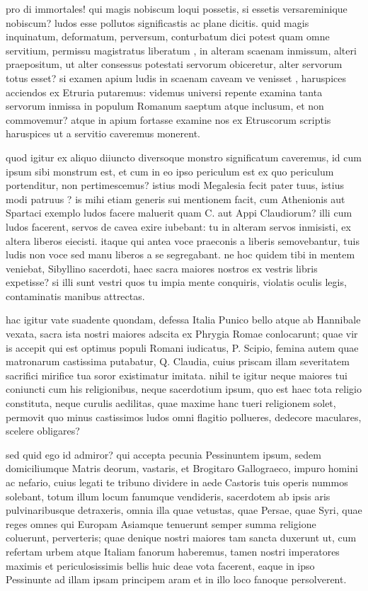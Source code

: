  pro di immortales! qui magis nobiscum loqui possetis, si essetis versareminique nobiscum? ludos esse pollutos significastis ac plane dicitis. quid magis inquinatum, deformatum, perversum, conturbatum dici potest quam omne servitium, permissu magistratus liberatum , in alteram scaenam inmissum, alteri praepositum, ut alter consessus potestati servorum obiceretur, alter servorum totus esset? si examen apium ludis in scaenam caveam ve venisset , haruspices acciendos ex Etruria putaremus: videmus universi repente examina tanta servorum inmissa in populum Romanum saeptum atque inclusum, et non commovemur? atque in apium fortasse examine nos ex Etruscorum scriptis haruspices ut a servitio caveremus monerent.

 quod igitur ex aliquo diiuncto diversoque monstro significatum caveremus, id cum ipsum sibi monstrum est, et cum in eo ipso periculum est ex quo periculum portenditur, non pertimescemus? istius modi Megalesia fecit pater tuus, istius modi patruus ? is mihi etiam generis sui mentionem facit, cum Athenionis aut Spartaci exemplo ludos facere maluerit quam C. aut Appi Claudiorum? illi cum ludos facerent, servos de cavea exire iubebant: tu in alteram servos inmisisti, ex altera liberos eiecisti. itaque qui antea voce praeconis a liberis semovebantur, tuis ludis non voce sed manu liberos a se segregabant. ne hoc quidem tibi in mentem veniebat, Sibyllino sacerdoti, haec sacra maiores nostros ex vestris libris expetisse? si illi sunt vestri quos tu impia mente conquiris, violatis oculis legis, contaminatis manibus attrectas.

 hac igitur vate suadente quondam, defessa Italia Punico bello atque ab Hannibale vexata, sacra ista nostri maiores adscita ex Phrygia Romae conlocarunt; quae vir is accepit qui est optimus populi Romani iudicatus, P. Scipio, femina autem quae matronarum castissima putabatur, Q. Claudia, cuius priscam illam severitatem sacrifici mirifice tua soror existimatur imitata. nihil te igitur neque maiores tui coniuncti cum his religionibus, neque sacerdotium ipsum, quo est haec tota religio constituta, neque curulis aedilitas, quae maxime hanc tueri religionem solet, permovit quo minus castissimos ludos omni flagitio pollueres, dedecore maculares, scelere obligares?

 sed quid ego id admiror? qui accepta pecunia Pessinuntem ipsum, sedem domiciliumque Matris deorum, vastaris, et Brogitaro Gallograeco, impuro homini ac nefario, cuius legati te tribuno dividere in aede Castoris tuis operis nummos solebant, totum illum locum fanumque vendideris, sacerdotem ab ipsis aris pulvinaribusque detraxeris, omnia illa quae vetustas, quae Persae, quae Syri, quae reges omnes qui Europam Asiamque tenuerunt semper summa religione coluerunt, perverteris; quae denique nostri maiores tam sancta duxerunt ut, cum refertam urbem atque Italiam fanorum haberemus, tamen nostri imperatores maximis et periculosissimis bellis huic deae vota facerent, eaque in ipso Pessinunte ad illam ipsam principem aram et in illo loco fanoque persolverent.

